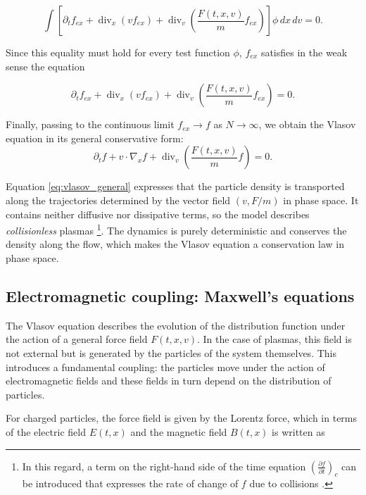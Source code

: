 \documentclass[11pt,a4paper,twoside,pdf]{article}
\numberwithin{equation}{section}
\begin{document}
\[
\int \left[
\partial_t f_{ex}
+ \operatorname{div}_x(v f_{ex})
+ \operatorname{div}_v\!\left(\frac{F(t,x,v)}{m} f_{ex}\right)
\right]\phi\,dx\,dv = 0.
\]



Since this equality must hold for every test function $\phi$, $f_{ex}$ satisfies in the weak sense the equation


\[
\partial_t f_{ex}
+ \operatorname{div}_x(v f_{ex})
+ \operatorname{div}_v\!\left(\frac{F(t,x,v)}{m} f_{ex}\right)=0.
\]



Finally, passing to the continuous limit $f_{ex}\to f$ as $N\to\infty$, we obtain
the Vlasov equation in its general conservative form:
\begin{equation}
\partial_t f + v\cdot\nabla_x f
+ \operatorname{div}_v\!\left(\frac{F(t,x,v)}{m}f\right)=0.
\label{eq:vlasov_general}
\end{equation}

\medskip


Equation \eqref{eq:vlasov_general} expresses that the particle density is
transported along the trajectories determined by the vector field
$(v,F/m)$ in phase space. It contains neither diffusive nor dissipative terms,
so the model describes \emph{collisionless} plasmas \footnote{In this regard, a term on the right-hand side of the time equation $\left( \frac{\partial f}{\partial t} \right)_c$ can be introduced that expresses the rate of change of $f$ due to collisions \cite{chen1984introduction}.}. The dynamics is
purely deterministic and conserves the density along the flow, which makes
the Vlasov equation a conservation law in phase space.




\subsection{Electromagnetic coupling: Maxwell's equations}

The Vlasov equation describes the evolution of the distribution function under the
action of a general force field $F(t,x,v)$. In the case of plasmas, this field
is not external but is generated by the particles of the system themselves. This introduces a fundamental coupling: the particles move under
the action of electromagnetic fields and these fields in turn depend on
the distribution of particles.

For charged particles, the force field is given by the Lorentz force,
which in terms of the electric field $E(t,x)$ and the magnetic field $B(t,x)$ is
written as \cite{martin2021campo}
\end{document}
